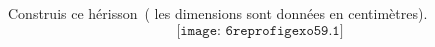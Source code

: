 Construis ce \og hérisson\fg\ ( les dimensions sont données en centimètres).
\vspace{0.5cm}
\[\texttt{[image: 6reprofigexo59.1]}\]
